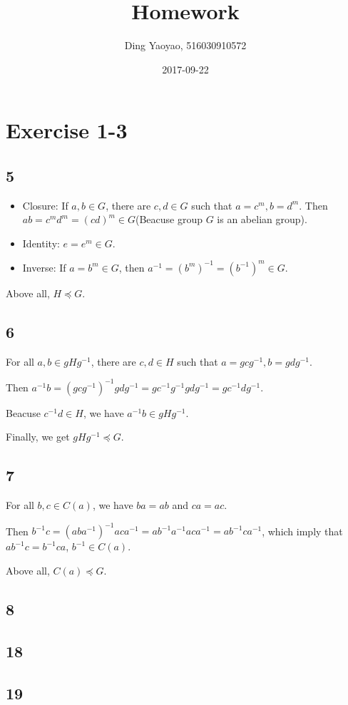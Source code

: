 \documentclass{article}
\title{Homework}
\date{2017-09-22}
\author{Ding Yaoyao, 516030910572}
\begin{document}
	\maketitle

	\section*{Exercise 1-3}
		\subsection*{5}

		\begin{itemize}
			\item Closure: If $a,b \in G$, there are $c,d \in G$ such that $a = c^m, b = d^m$. Then $ab=c^md^m=(cd)^m \in G$(Beacuse group $G$ is an abelian group).
			\item Identity: $e = e^m \in G$.
			\item Inverse: If $a = b^m \in G$, then $a^{-1} = (b^m)^{-1} = (b^{-1})^m \in G$.
		\end{itemize}

		Above all, $H \preccurlyeq G$.

		\subsection{6}

		For all $a, b \in gHg^{-1}$, there are $c,d \in H$ such that $a = gcg^{-1}, b = gdg^{-1}$. 
		
		Then $a^{-1}b = (gcg^{-1})^{-1}gdg^{-1} = gc^{-1}g^{-1}gdg^{-1} = gc^{-1}dg^{-1}$. 
		
		Beacuse $c^{-1}d \in H$, we have $a^{-1}b \in gHg^{-1}$. 
		
		Finally, we get $gHg^{-1} \preccurlyeq G$.

		\subsection*{7}

		For all $b, c \in C(a)$, we have $ba = ab$ and $ca = ac$.

		Then $b^{-1}c = (aba^{-1})^{-1}aca^{-1} = ab^{-1}a^{-1}aca^{-1} = ab^{-1}ca^{-1}$, which imply that $ab^{-1}c=b^{-1}ca$, $b^{-1} \in C(a)$.

		Above all, $C(a) \preccurlyeq G$.

		\subsection*{8}

		

		\subsection*{18}
		\subsection*{19}
\end{document}
